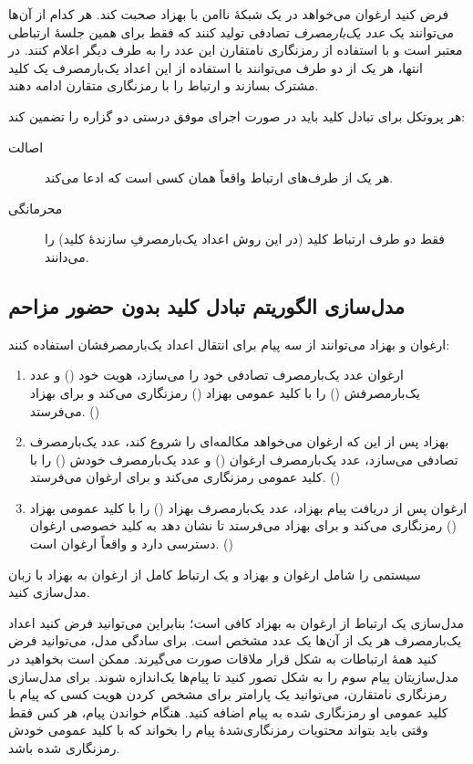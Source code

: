 \documentclass[a4paper]{article}
\begin{document}
فرض کنید ارغوان می‌خواهد در یک شبکهٔ ناامن با بهزاد صحبت کند.
هر کدام از آن‌ها می‌توانند
یک \textit{عدد یک‌بارمصرف} تصادفی تولید کنند که فقط برای همین جلسهٔ ارتباطی معتبر است
و با استفاده از رمزنگاری نامتقارن
این عدد را به طرف دیگر اعلام کنند.
در انتها، هر یک از دو طرف می‌توانند با استفاده از این اعداد یک‌بارمصرف یک کلید مشترک بسازند
و ارتباط را با رمزنگاری متقارن ادامه دهند.

هر پروتکل برای تبادل کلید باید در صورت اجرای موفق درستی دو گزاره را تضمین کند:
\begin{description}
    \item[اصالت] هر یک از طرف‌های ارتباط واقعاً همان کسی است که ادعا می‌کند.
    \item[محرمانگی] فقط دو طرف ارتباط کلید (در این روش اعداد یک‌بارمصرفِ سازندهٔ کلید) را می‌دانند.
\end{description}

\subsection{مدل‌سازی الگوریتم تبادل کلید بدون حضور مزاحم}

ارغوان و بهزاد می‌توانند از سه پیام برای انتقال اعداد یک‌بارمصرفشان استفاده کنند:
\begin{enumerate}
    \item ارغوان عدد یک‌بارمصرف تصادفی خود را می‌سازد، هویت خود () و عدد یک‌بارمصرفش () را با کلید عمومی بهزاد () رمزنگاری می‌کند و برای بهزاد می‌فرستد. ()
    \item بهزاد پس از این که ارغوان می‌خواهد مکالمه‌ای را شروع کند، عدد یک‌بارمصرف تصادفی می‌سازد، عدد یک‌بارمصرف ارغوان () و عدد یک‌بارمصرف خودش () را با کلید عمومی  رمزنگاری می‌کند و برای ارغوان می‌فرستد. ()
    \item ارغوان پس از دریافت پیام بهزاد، عدد یک‌بارمصرف بهزاد () را با کلید عمومی بهزاد () رمزنگاری می‌کند و برای بهزاد می‌فرستد تا نشان دهد به کلید خصوصی ارغوان دسترسی دارد و واقعاً ارغوان است. ()
\end{enumerate}

سیستمی را شامل ارغوان و بهزاد و یک ارتباط کامل از ارغوان به بهزاد با زبان  مدل‌سازی کنید.

مدل‌سازی یک ارتباط از ارغوان به بهزاد کافی است؛
بنابراین می‌توانید فرض کنید اعداد یک‌بارمصرف هر یک از آن‌ها یک عدد مشخص است.
برای سادگی مدل، می‌توانید فرض کنید همهٔ ارتباطات به شکل قرار ملاقات صورت می‌گیرند.
ممکن است بخواهید در مدل‌سازیتان پیام سوم را به شکل  تصور کنید
تا پیام‌ها یک‌اندازه شوند.
برای مدل‌سازی رمزنگاری نامتقارن، می‌توانید یک پارامتر برای مشخص~کردن هویت کسی که پیام با کلید عمومی او رمزنگاری شده به پیام اضافه کنید.
هنگام خواندن پیام، هر کس فقط وقتی باید بتواند محتویات رمزنگاری‌شدهٔ پیام را بخواند که با کلید عمومی خودش رمزنگاری شده باشد.
\end{document}
